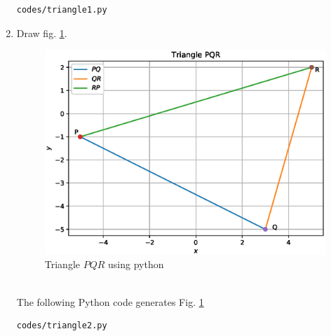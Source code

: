 \begin{enumerate}[label=\thesection.\arabic*.,ref=\thesection.\theenumi]
\begin{lstlisting}
codes/triangle1.py
\end{lstlisting}


\item Draw fig. \ref{fig:triangle_2}.
\begin{figure}[!ht]
\centering
\includegraphics[width=\columnwidth]{./codes/triangle2.eps}
\caption{Triangle $PQR$ using python}
\label{fig:triangle_2}
\end{figure} \\
\solution The  following Python code generates Fig. \ref{fig:triangle_2}

\begin{lstlisting}
codes/triangle2.py
\end{lstlisting}

 
%
\end{enumerate}
  

